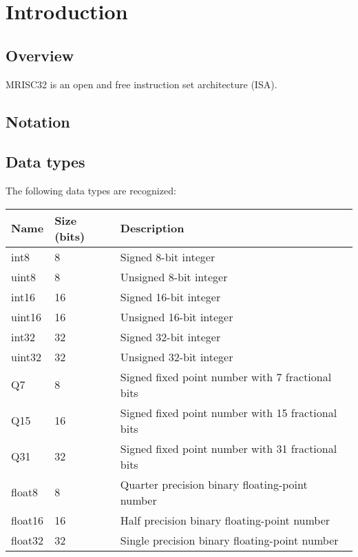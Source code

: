 %

\chapter{Introduction}

\section{Overview}

MRISC32 is an open and free instruction set architecture (ISA).

\section{Notation}

\tbd

\section{Data types}

The following data types are recognized:

\begin{tabular}{|l|l|l|}
  \hline
  \textbf{Name} & \textbf{Size (bits)} & \textbf{Description} \\
  \hline
  int8 & 8 & Signed 8-bit integer \\
  \hline
  uint8 & 8 & Unsigned 8-bit integer \\
  \hline
  int16 & 16 & Signed 16-bit integer \\
  \hline
  uint16 & 16 & Unsigned 16-bit integer \\
  \hline
  int32 & 32 & Signed 32-bit integer \\
  \hline
  uint32 & 32 & Unsigned 32-bit integer \\
  \hline
  Q7 & 8 & Signed fixed point number with 7 fractional bits \\
  \hline
  Q15 & 16 & Signed fixed point number with 15 fractional bits \\
  \hline
  Q31 & 32 & Signed fixed point number with 31 fractional bits \\
  \hline
  float8 & 8 & Quarter precision binary floating-point number \\
  \hline
  float16 & 16 & Half precision binary floating-point number \\
  \hline
  float32 & 32 & Single precision binary floating-point number \\
  \hline
\end{tabular}

